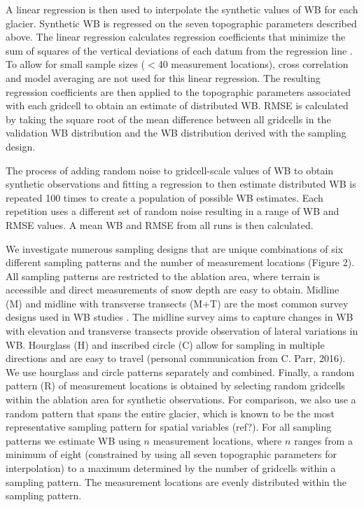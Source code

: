 \documentclass[twocolumn,letterpaper]{igs}
\begin{document}
A linear regression is then used to interpolate the synthetic values of WB for each glacier. Synthetic WB is regressed on the seven topographic parameters described above. The linear regression calculates regression coefficients that minimize the sum of squares of the vertical deviations of each datum from the regression line \citep{Davis1986}. To allow for small sample sizes ($<$40 measurement locations), cross correlation and model averaging are not used for this linear regression. The resulting regression coefficients are then applied to the topographic parameters associated with each gridcell to obtain an estimate of distributed WB. RMSE is calculated by taking the square root of the mean difference between all gridcells in the validation WB distribution and the WB distribution derived with the sampling design.

The process of adding random noise to gridcell-scale values of WB to obtain synthetic observations and fitting a regression to then estimate distributed WB is repeated 100 times to create a population of possible WB estimates. Each repetition uses a different set of random noise resulting in a range of WB and RMSE values. A mean WB and RMSE from all runs is then calculated. 

We investigate numerous sampling designs that are unique combinations of six different sampling patterns and the number of measurement locations (Figure 2). All sampling patterns are restricted to the ablation area, where terrain is accessible and direct measurements of snow depth are easy to obtain. Midline (M) and midline with transverse transects (M+T) are the most common survey designs used in WB studies \citep[e.g.][]{Kaser2002,Machguth2006}. The midline survey aims to capture changes in WB with elevation and transverse transects provide observation of lateral variations in WB. Hourglass (H) and inscribed circle (C) allow for sampling in multiple directions and are easy to travel (personal communication from C. Parr, 2016). We use hourglass and circle patterns separately and combined. Finally, a random pattern (R) of measurement locations is obtained by selecting random gridcells within the ablation area for synthetic observations. For comparison, we also use a random pattern that spans the entire glacier, which is known to be the most representative sampling pattern for spatial variables (ref?). For all sampling patterns we estimate WB using $n$ measurement locations, where $n$ ranges from a minimum of eight (constrained by using all seven topographic parameters for interpolation) to a maximum determined by the number of gridcells within a sampling pattern. The measurement locations are evenly distributed within the sampling pattern. 
\end{document}
